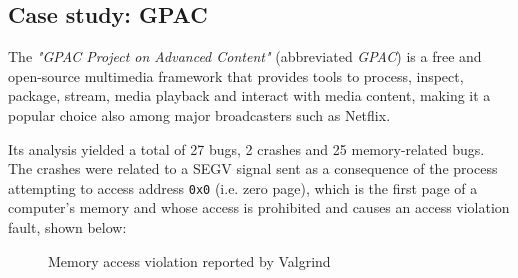 \newpage
\subsection{Case study: GPAC}
The \textit{"GPAC Project on Advanced Content"} (abbreviated \textit{GPAC}) \cite{gpac} is a free and open-source multimedia framework that provides tools to process, inspect, package, stream, media playback and interact with media content, making it a popular choice also among major broadcasters such as Netflix.

Its analysis yielded a total of 27 bugs, 2 crashes and 25 memory-related bugs.
The crashes were related to a SEGV signal sent as a consequence of the process attempting to access address \verb|0x0| (i.e. zero page), which is the first page of a computer's memory and whose access is prohibited and causes an access violation fault, shown below:
\begin{figure}[h]
\caption{Memory access violation reported by Valgrind}
\label{fig:segv_gpac}
\end{figure}
\ \\

